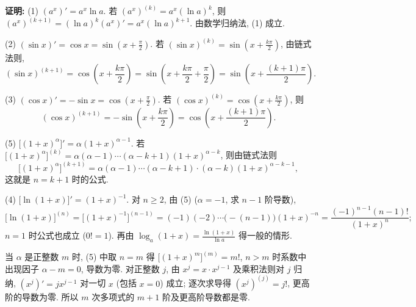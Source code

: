 \documentclass[UTF8,openany]{ctexbook}
\theoremstyle{chinesetextbook}
\newenvironment{cnproof}{\par\indent\textbf{证明:} \ignorespaces}{\par}
\begin{document}
\begin{cnproof}
(1) $(a^x)'=a^x\ln a$. 若 $(a^x)^{(k)}=a^x(\ln a)^k$, 则 $(a^x)^{(k+1)}=(\ln a)^k(a^x)'=a^x(\ln a)^{k+1}$. 由数学归纳法, (1) 成立.

(2) $\displaystyle(\sin x)'=\cos x=\sin\left(x+\frac\pi2\right)$. 若 $\displaystyle(\sin x)^{(k)}=\sin\left(x+\frac{k\pi}2\right)$, 由链式法则,
\[
(\sin x)^{(k+1)}=\cos\left(x+\frac{k\pi}2\right)=\sin\left(x+\frac{k\pi}2+\frac\pi2\right)=\sin\left(x+\frac{(k+1)\pi}2\right).
\]

(3) $\displaystyle(\cos x)'=-\sin x=\cos\left(x+\frac\pi2\right)$. 若 $\displaystyle(\cos x)^{(k)}=\cos\left(x+\frac{k\pi}2\right)$, 则
\[
(\cos x)^{(k+1)}=-\sin\left(x+\frac{k\pi}2\right)=\cos\left(x+\frac{(k+1)\pi}2\right).
\]

(5) $\bigl[(1+x)^\alpha\bigr]'=\alpha(1+x)^{\alpha-1}$. 若 $\bigl[(1+x)^\alpha\bigr]^{(k)}=\alpha(\alpha-1)\cdots(\alpha-k+1)(1+x)^{\alpha-k}$, 则由链式法则
\[
\bigl[(1+x)^\alpha\bigr]^{(k+1)}=\alpha(\alpha-1)\cdots(\alpha-k+1)\cdot(\alpha-k)(1+x)^{\alpha-k-1},
\]
这就是 $n=k+1$ 时的公式.

(4) $\displaystyle\bigl[\ln(1+x)\bigr]'=(1+x)^{-1}$. 对 $n\ge2$, 由 (5) ($\alpha=-1$, 求 $n-1$ 阶导数),
\[
\bigl[\ln(1+x)\bigr]^{(n)}=\bigl[(1+x)^{-1}\bigr]^{(n-1)}=(-1)(-2)\cdots\bigl(-(n-1)\bigr)(1+x)^{-n}=\frac{(-1)^{n-1}(n-1)!}{(1+x)^n};
\]
$n=1$ 时公式也成立 ($0!=1$). 再由 $\displaystyle\log_a(1+x)=\frac{\ln(1+x)}{\ln a}$ 得一般的情形.
\end{cnproof}
当 $\alpha$ 是正整数 $m$ 时, (5) 中取 $n=m$ 得 $\bigl[(1+x)^m\bigr]^{(m)}=m!$, $n>m$ 时系数中出现因子 $\alpha-m=0$, 导数为零. 对正整数 $j$, 由 $x^j=x\cdot x^{j-1}$ 及乘积法则对 $j$ 归纳, $(x^j)'=jx^{j-1}$ 对一切 $x$ (包括 $x=0$) 成立; 逐次求导得 $(x^j)^{(j)}=j!$, 更高阶的导数为零. 所以 $m$ 次多项式的 $m+1$ 阶及更高阶导数都是零.
\end{document}
